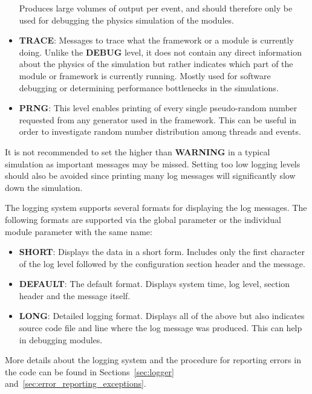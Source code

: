 \begin{itemize}
Produces large volumes of output per event, and should therefore only be used for  debugging the physics simulation of the modules.
\item \textbf{TRACE}: Messages to trace what the framework or a module is currently doing.
Unlike the \textbf{DEBUG} level, it does not contain any direct information about the physics of the simulation but rather indicates which part of the module or framework is currently running.
Mostly used for software debugging or determining performance bottlenecks in the simulations.
\item \textbf{PRNG}: This level enables printing of every single pseudo-random number requested from any generator used in the framework. This can be useful in order to investigate random number distribution among threads and events.
\end{itemize}

\begin{warning}
    It is not recommended to set the  higher than \textbf{WARNING} in a typical simulation as important messages may be missed.
    Setting too low logging levels should also be avoided since printing many log messages will significantly slow down the simulation.
\end{warning}

The logging system supports several formats for displaying the log messages.
The following formats are supported via the global parameter  or the individual module parameter with the same name:
\begin{itemize}
\item \textbf{SHORT}: Displays the data in a short form.
Includes only the first character of the log level followed by the configuration section header and the message.
\item \textbf{DEFAULT}: The default format.
Displays system time, log level, section header and the message itself.
\item \textbf{LONG}: Detailed logging format.
Displays all of the above but also indicates source code file and line where the log message was produced.
This can help in debugging modules.
\end{itemize}

More details about the logging system and the procedure for reporting errors in the code can be found in Sections~\ref{sec:logger} and~\ref{sec:error_reporting_exceptions}.

